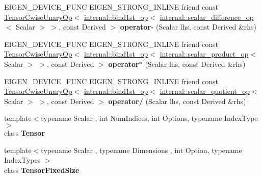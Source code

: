 \begin{DoxyCompactItemize}
\item 
\mbox{\label{class_eigen_1_1_tensor_base_3_01_derived_00_01_read_only_accessors_01_4_a4094a10d6b45e86b0b6b3a41598241f1}} 
E\+I\+G\+E\+N\+\_\+\+D\+E\+V\+I\+C\+E\+\_\+\+F\+U\+NC E\+I\+G\+E\+N\+\_\+\+S\+T\+R\+O\+N\+G\+\_\+\+I\+N\+L\+I\+NE friend const \hyperlink{class_eigen_1_1_tensor_cwise_unary_op}{Tensor\+Cwise\+Unary\+Op}$<$ \hyperlink{struct_eigen_1_1internal_1_1bind1st__op}{internal\+::bind1st\+\_\+op}$<$ \hyperlink{struct_eigen_1_1internal_1_1scalar__difference__op}{internal\+::scalar\+\_\+difference\+\_\+op}$<$ Scalar $>$ $>$, const Derived $>$ {\bfseries operator-\/} (Scalar lhs, const Derived \&rhs)
\item 
\mbox{\label{class_eigen_1_1_tensor_base_3_01_derived_00_01_read_only_accessors_01_4_a8bbbda6be284c0a19df2b4880a05fbac}} 
E\+I\+G\+E\+N\+\_\+\+D\+E\+V\+I\+C\+E\+\_\+\+F\+U\+NC E\+I\+G\+E\+N\+\_\+\+S\+T\+R\+O\+N\+G\+\_\+\+I\+N\+L\+I\+NE friend const \hyperlink{class_eigen_1_1_tensor_cwise_unary_op}{Tensor\+Cwise\+Unary\+Op}$<$ \hyperlink{struct_eigen_1_1internal_1_1bind1st__op}{internal\+::bind1st\+\_\+op}$<$ \hyperlink{struct_eigen_1_1internal_1_1scalar__product__op}{internal\+::scalar\+\_\+product\+\_\+op}$<$ Scalar $>$ $>$, const Derived $>$ {\bfseries operator$\ast$} (Scalar lhs, const Derived \&rhs)
\item 
\mbox{\label{class_eigen_1_1_tensor_base_3_01_derived_00_01_read_only_accessors_01_4_a9fc18b09b241938d04dd1ec05a6aada6}} 
E\+I\+G\+E\+N\+\_\+\+D\+E\+V\+I\+C\+E\+\_\+\+F\+U\+NC E\+I\+G\+E\+N\+\_\+\+S\+T\+R\+O\+N\+G\+\_\+\+I\+N\+L\+I\+NE friend const \hyperlink{class_eigen_1_1_tensor_cwise_unary_op}{Tensor\+Cwise\+Unary\+Op}$<$ \hyperlink{struct_eigen_1_1internal_1_1bind1st__op}{internal\+::bind1st\+\_\+op}$<$ \hyperlink{struct_eigen_1_1internal_1_1scalar__quotient__op}{internal\+::scalar\+\_\+quotient\+\_\+op}$<$ Scalar $>$ $>$, const Derived $>$ {\bfseries operator/} (Scalar lhs, const Derived \&rhs)
\item 
\mbox{\label{class_eigen_1_1_tensor_base_3_01_derived_00_01_read_only_accessors_01_4_ad1945ad54713b8f3899a91229b6ab14f}} 
{\footnotesize template$<$typename Scalar , int Num\+Indices, int Options, typename Index\+Type $>$ }\\class {\bfseries Tensor}
\item 
\mbox{\label{class_eigen_1_1_tensor_base_3_01_derived_00_01_read_only_accessors_01_4_af0e7bc83af1d822a3aa5fc25b22315e3}} 
{\footnotesize template$<$typename Scalar , typename Dimensions , int Option, typename Index\+Types $>$ }\\class {\bfseries Tensor\+Fixed\+Size}
\end{DoxyCompactItemize}


